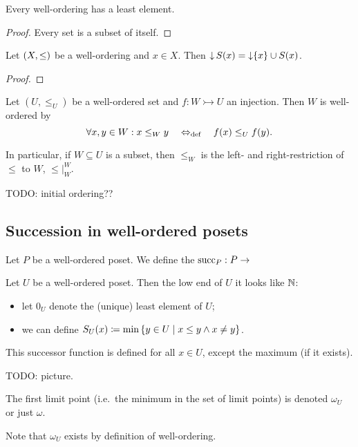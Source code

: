 \begin{lemma}
Every well-ordering has a least element.
\end{lemma}
\begin{proof}
Every set is a subset of itself.
\end{proof}

\begin{lemma}
Let $\sSet{X,\leq}$ be a well-ordering and $x\in X$. Then $\operatorname{\downarrow} S(x) = \operatorname{\downarrow}\{x\}\cup S(x)$.
\end{lemma}
\begin{proof}

\end{proof}

\begin{lemma} \label{wellOrderingSubsets}
Let $(U,\leq_U)$ be a well-ordered set and $f: W \rightarrowtail U$ an injection. Then $W$ is well-ordered by
\[ \forall x,y\in W: x\leq_W y \quad\Leftrightarrow_{\text{def}}\quad f(x) \leq_U f(y). \]


In particular, if $W\subseteq U$ is a subset, then $\leq_W$ is the left- and right-restriction of $\leq$ to $W$, $\leq|_W^W$.
\end{lemma}
TODO: initial ordering??



\subsection{Succession in well-ordered posets}
\begin{definition}
Let $P$ be a well-ordered poset. We define the  $\operatorname{succ}_P: P\to $
\end{definition}

Let $U$ be a well-ordered poset. Then the low end of $U$ it looks like $\mathbb{N}$:
\begin{itemize}
\item let $0_U$ denote the (unique) least element of $U$;
\item we can define $S_U(x) \defeq \min\setbuilder{y\in U}{x\leq y \land x\neq y}$.
\end{itemize}
This successor function is defined for all $x\in U$, except the maximum (if it exists).

TODO: picture.

\begin{definition}
The first limit point (i.e.\ the minimum in the set of limit points) is denoted $\omega_U$ or just $\omega$.
\end{definition}
Note that $\omega_U$ exists by definition of well-ordering.


